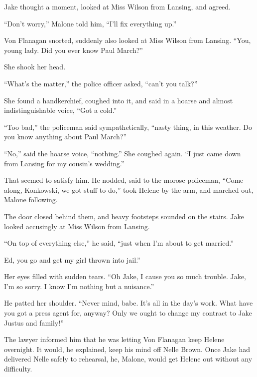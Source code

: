 \documentclass{novel}
\begin{document}
Jake thought a moment, looked at Miss Wilson from Lansing, and agreed.

“Don’t worry,” Malone told him, “I’ll fix everything up.”

Von Flanagan snorted, suddenly also looked at Miss Wilson from Lansing. “You, young lady. Did you ever know Paul March?”

She shook her head.

“What’s the matter,” the police officer asked, “can’t you talk?”

She found a handkerchief, coughed into it, and said in a hoarse and almost indistinguishable voice, “Got a cold.”

“Too bad,” the policeman said sympathetically, “nasty thing, in this weather. Do you know anything about Paul March?”

“No,” said the hoarse voice, “nothing.” She coughed again. “I just came down from Lansing for my cousin’s wedding.”

That seemed to satisfy him. He nodded, said to the morose policeman, “Come along, Konkowski, we got stuff to do,” took Helene by the arm, and marched out, Malone following.

The door closed behind them, and heavy footsteps sounded on the stairs. Jake looked accusingly at Miss Wilson from Lansing.

“On top of everything else,” he said, “just when I’m about to get married.”

Ed, you go and get my girl thrown into jail.”

Her eyes filled with sudden tears. “Oh Jake, I cause you so much trouble. Jake, I’m so sorry. I know I'm nothing but a nuisance.”

He patted her shoulder. “Never mind, babe. It’s all in the day’s work. What have you got a press agent for, anyway? Only we ought to change my contract to Jake Justus and family!”

\begin{ChapterStart}
\vspace{3\nbs}
\end{ChapterStart}

The lawyer informed him that he was letting Von Flanagan keep Helene overnight. It would, he explained, keep his mind off Nelle Brown. Once Jake had delivered Nelle safely to rehearsal, he, Malone, would get Helene out without any difficulty.
\end{document}
